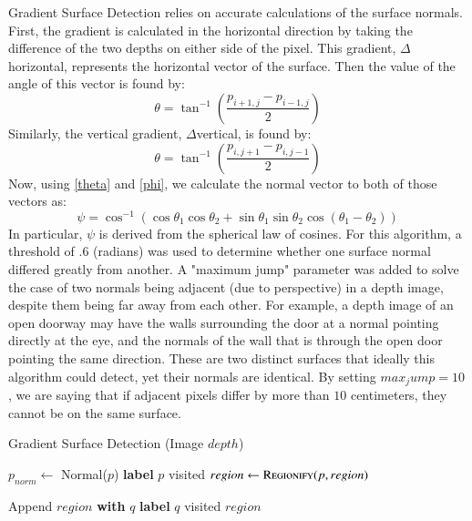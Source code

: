 Gradient Surface Detection relies on accurate calculations of the surface normals. First, the gradient is calculated in the horizontal direction by taking the difference of the two depths on either side of the pixel. This gradient, $\Delta$horizontal, represents the horizontal vector of the surface. Then the value of the angle of this vector is found by: 
\begin{equation}\label{theta}\theta = \tan^{-1}{(\frac{p_{i+1,j}-p_{i-1,j}}{2})} \end{equation}
Similarly, the vertical gradient, $\Delta$vertical, is found by:
\begin{equation}\label{phi}\theta = \tan^{-1}{(\frac{p_{i,j+1}-p_{i,j-1}}{2})} \end{equation}
Now, using \eqref{theta} and \eqref{phi}, we calculate the normal vector to both of those vectors as:
\begin{equation}\label{psi}\psi = \cos^{-1}{(\cos{\theta_1}\cos{\theta_2} + \sin{\theta_1}\sin{\theta_2}\cos{(\theta_1-\theta_2)})} \end{equation}
In particular, $\psi$ is derived from the spherical law of cosines. For this algorithm, a threshold of .6 (radians) was used to determine whether one surface normal differed greatly from another. A "maximum jump" parameter was added to solve the case of two normals being adjacent (due to perspective) in a depth image, despite them being far away from each other. For example, a depth image of an open doorway may have the walls surrounding the door at a normal pointing directly at the eye, and the normals of the wall that is through the open door pointing the same direction. These are two distinct surfaces that ideally this algorithm could detect, yet their normals are identical. By setting $max_jump =  10$, we are saying that if adjacent pixels differ by more than $10$ centimeters, they cannot be on the same surface.



\begin{algorithm}
\caption{Gradient Surface Detection (Image $depth$)}\label{gradient}
\begin{algorithmic}[1]
\State $p_{norm} \gets$ Normal($p$) 
\EndFor
{}
\State \textbf{label} $p$ visited
\State $region \gets \Call{Regionify}{p, region}$
\EndIf
\EndFor
\item[]
\State Append $region$ \textbf{with} $q$
\State \textbf{label} $q$ visited
\State {}
\EndIf
\EndFor
\State \Return $region$
\EndProcedure
\end{algorithmic}
\end{algorithm}
